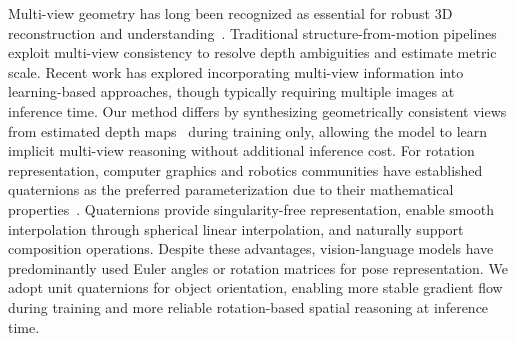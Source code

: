Multi-view geometry has long been recognized as essential for robust 3D reconstruction and understanding~\cite{hartley2003multiple}. Traditional structure-from-motion pipelines exploit multi-view consistency to resolve depth ambiguities and estimate metric scale. Recent work has explored incorporating multi-view information into learning-based approaches, though typically requiring multiple images at inference time. Our method differs by synthesizing geometrically consistent views from estimated depth maps~\cite{yang2024depth} during training only, allowing the model to learn implicit multi-view reasoning without additional inference cost. For rotation representation, computer graphics and robotics communities have established quaternions as the preferred parameterization due to their mathematical properties~\cite{shoemake1985animating}. Quaternions provide singularity-free representation, enable smooth interpolation through spherical linear interpolation, and naturally support composition operations. Despite these advantages, vision-language models have predominantly used Euler angles or rotation matrices for pose representation. We adopt unit quaternions for object orientation, enabling more stable gradient flow during training and more reliable rotation-based spatial reasoning at inference time.
